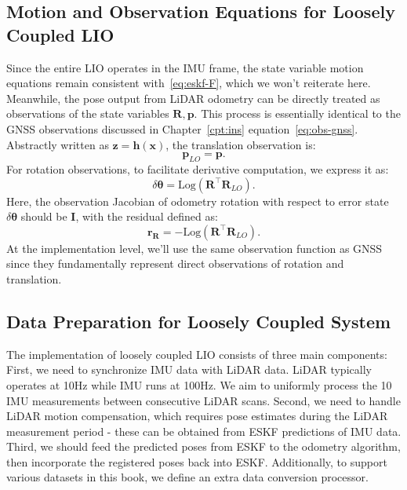 \subsection{Motion and Observation Equations for Loosely Coupled LIO}
Since the entire LIO operates in the IMU frame, the state variable motion equations remain consistent with~\eqref{eq:eskf-F}, which we won't reiterate here. Meanwhile, the pose output from LiDAR odometry can be directly treated as observations of the state variables $\mathbf{R}, \mathbf{p}$. This process is essentially identical to the GNSS observations discussed in Chapter~\ref{cpt:ins} equation~\eqref{eq:obs-gnss}. Abstractly written as $\mathbf{z}=\mathbf{h}(\mathbf{x})$, the translation observation is:
\begin{equation}\label{key}
	\mathbf{p}_{LO} = \mathbf{p}.
\end{equation}
For rotation observations, to facilitate derivative computation, we express it as:
\begin{equation}\label{key}
	\delta \boldsymbol{\theta} = \mathrm{Log}(\mathbf{R}^\top \mathbf{R}_{LO}).
\end{equation}
Here, the observation Jacobian of odometry rotation with respect to error state $\delta \boldsymbol{\theta}$ should be $\mathbf{I}$, with the residual defined as:
\begin{equation}\label{key}
	\mathbf{r}_{\mathbf{R}} = - \mathrm{Log}( \mathbf{R}^\top \mathbf{R}_{LO}).
\end{equation}
At the implementation level, we'll use the same observation function as GNSS since they fundamentally represent direct observations of rotation and translation.

\subsection{Data Preparation for Loosely Coupled System}
The implementation of loosely coupled LIO consists of three main components: First, we need to synchronize IMU data with LiDAR data. LiDAR typically operates at 10Hz while IMU runs at 100Hz. We aim to uniformly process the 10 IMU measurements between consecutive LiDAR scans. Second, we need to handle LiDAR motion compensation, which requires pose estimates during the LiDAR measurement period - these can be obtained from ESKF predictions of IMU data. Third, we should feed the predicted poses from ESKF to the odometry algorithm, then incorporate the registered poses back into ESKF. Additionally, to support various datasets in this book, we define an extra data conversion processor.

